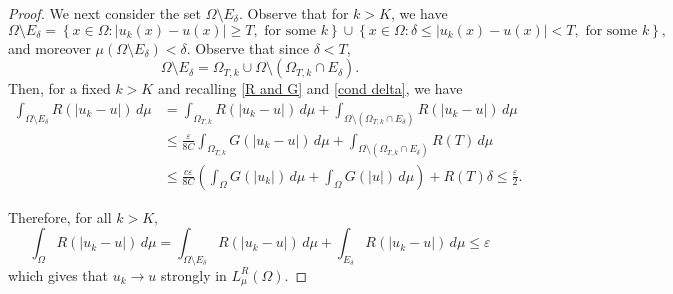 \documentclass[10pt,a4paper]{amsart}
\begin{document}
\begin{proof}
We next consider the set $\Omega\setminus E_{\delta}$.  Observe that  for $k> K$, we have 
$$
\Omega\setminus E_{\delta} = \left\lbrace x\in \Omega: |u_k(x)-u(x)|\geq T, \text{ for some }k\right\rbrace \cup \left\lbrace x\in \Omega: \delta \leq |u_k(x)-u(x)|< T, \text{ for some }k\right\rbrace,
$$
and moreover $\mu(\Omega\setminus E_{\delta})<\delta$. Observe that since $\delta<T$,
$$\Omega\setminus E_{\delta}= \Omega_{T, k} \cup \Omega \setminus (\Omega_{T, k}\cap E_{\delta}).$$  Then, for a fixed $k>K$ and recalling \eqref{R and G} and \eqref{cond delta}, we have
\begin{equation}
\begin{split}
\int_{\Omega\setminus E_\delta} R(|u_k-u|)\,d\mu& =   \int_{\Omega_{T, k}} R(|u_k-u|)\,d\mu + \int_{\Omega \setminus (\Omega_{T, k}\cap E_\delta)} R(|u_k-u|)\,d\mu\\ & \leq 
 \frac{\varepsilon}{8C}\int_{\Omega_{T, k}} G(|u_k-u|)\,d\mu + \int_{\Omega \setminus (\Omega_{T, k}\cap E_\delta)} R(T)\,d\mu\\ & \leq  \frac{c\varepsilon}{8C}\left( \int_{\Omega} G(|u_k|)\,d\mu  + \int_\Omega G(|u|)\,d\mu\right)+R(T)\delta
 \leq \frac{\varepsilon}{2}.
\end{split}
\end{equation}

\medskip



Therefore, for all $k>K$,
$$
\int_\Omega R(|u_k-u|)\,d\mu = \int_{\Omega\setminus E_\delta} R(|u_k-u|)\,d\mu + \int_{E_\delta} R(|u_k-u|)\,d\mu \leq \varepsilon
$$
which gives that $u_k\to u$ strongly in $L_{\mu}^R(\Omega)$.
\end{proof}
\end{document}
